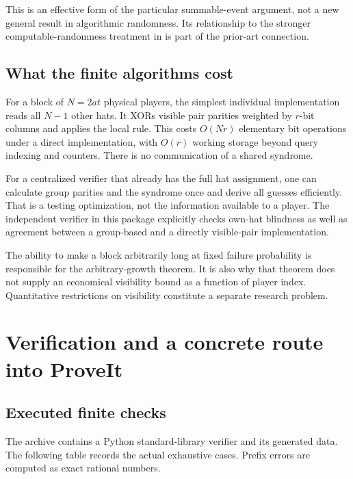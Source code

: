 \documentclass[11pt,letterpaper]{article}
\theoremstyle{definition}
\begin{document}
This is an effective form of the particular summable-event argument,
not a new general result in algorithmic randomness. Its relationship
to the stronger computable-randomness treatment in \cite{hat:EMV}
is part of the prior-art connection.

\subsection{What the finite algorithms cost}

For a block of \(N=2at\) physical players, the simplest individual
implementation reads all \(N-1\) other hats. It XORs visible pair
parities weighted by \(r\)-bit columns and applies the local rule.
This costs \(O(Nr)\) elementary bit operations under a direct
implementation, with \(O(r)\) working storage beyond query indexing
and counters. There is no communication of a shared syndrome.

For a centralized verifier that already has the full hat assignment,
one can calculate group parities and the syndrome once and derive
all guesses efficiently. That is a testing optimization, not the
information available to a player. The independent verifier in this
package explicitly checks own-hat blindness as well as agreement
between a group-based and a directly visible-pair implementation.

The ability to make a block arbitrarily long at fixed failure
probability is responsible for the arbitrary-growth theorem.
It is also why that theorem does not supply an economical visibility
bound as a function of player index. Quantitative restrictions on
visibility constitute a separate research problem.

\section{Verification and a concrete route into ProveIt}
\label{mbg:hat:sec:verification}

\subsection{Executed finite checks}

The archive contains a Python standard-library verifier and its
generated data. The following table records the actual exhaustive
cases. Prefix errors are computed as exact rational numbers.
\end{document}
